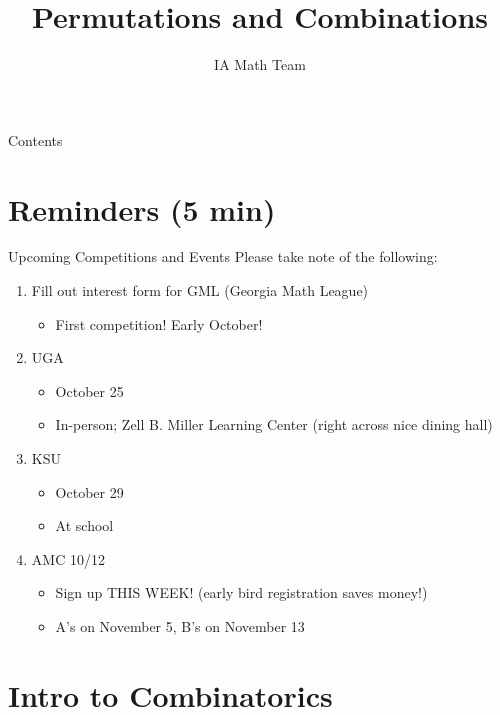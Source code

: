 \documentclass[aspectratio=169,xcolor=dvipsnames]{beamer}
\title[Permutations and Combinations]{Permutations and Combinations}
\author[IA Math Team]{IA Math Team}
\begin{document}
\begin{frame}[t]
  \titlepage
\end{frame}

\begin{frame}[t]{Contents}
  \tableofcontents
\end{frame}


\section{Reminders (5 min)}

\begin{frame}[t]{Upcoming Competitions and Events}
    Please take note of the following:
    \vspace{0.2cm}
    \begin{enumerate}
        \item Fill out interest form for GML (Georgia Math League)  %
        \begin{itemize}
            \item First competition! Early October!
        \end{itemize}
        \item UGA
        \begin{itemize}
            \item October 25
            \item In-person; Zell B. Miller Learning Center (right across nice dining hall)
        \end{itemize}
        \item KSU
        \begin{itemize}
            \item October 29
            \item At school
        \end{itemize}
        \item AMC 10/12
        \begin{itemize}
            \item Sign up THIS WEEK! (early bird registration saves money!)
            \item A's on November 5, B's on November 13
        \end{itemize}
    \end{enumerate}
\end{frame}

\section{Intro to Combinatorics}
\end{document}
